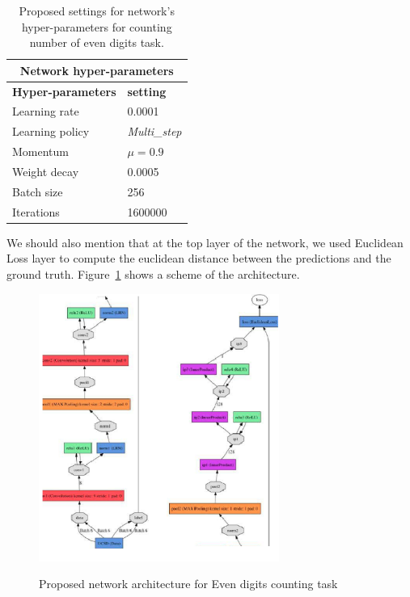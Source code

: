 \begin{table}[H]
	\centering
	\begin{tabular}{ |p{3.8cm}|p{1.7cm}| }
	\hline 
	\multicolumn{2}{|c|}{\textbf{Network hyper-parameters}} \\
	\hline
	\hline
	\textbf{Hyper-parameters} & \textbf{setting }\\
	\hline
	Learning rate & 0.0001\\
	\hline
	Learning policy    & \textit{Multi\_step} \\
	\hline
	Momentum & $\mu = 0.9$\\
	\hline
	Weight decay & 0.0005 \\
	\hline
	Batch size & 256 \\
	\hline
	Iterations & 1600000 \\
	\hline
	\end{tabular}
		\caption{Proposed settings for network's hyper-parameters for counting number of even digits task.}
		\label{hypers}
\end{table}
 

\noindent We should also mention that at the top layer of the network, we used Euclidean Loss layer to compute the euclidean distance between the predictions and the ground truth.  Figure~\ref{fig:l2cNet} shows a scheme of the architecture.
\begin{figure}[H]
  \centering
   {\includegraphics[width=0.7\textwidth]{images/model2}}
	\caption{Proposed network architecture for Even digits counting task}
	\label{fig:l2cNet}
\end{figure}

